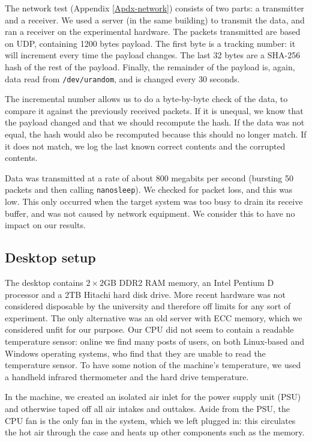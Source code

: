 \documentclass[conference]{IEEEtran}
\begin{document}
The network test (Appendix \ref{Apdx-network}) consists of two parts: a
transmitter and a receiver. We used a server (in the same building) to transmit
the data, and ran a receiver on the experimental hardware. The packets
transmitted are based on UDP, containing 1200 bytes payload. The first byte is
a tracking number: it will increment every time the payload changes. The last
32 bytes are a SHA-256 hash of the rest of the payload. Finally, the remainder
of the payload is, again, data read from \texttt{/dev/urandom}, and is changed
every 30 seconds.

The incremental number allows us to do a byte-by-byte check of the data, to
compare it against the previously received packets. If it is unequal, we know
that the payload changed and that we should recompute the hash. If the data was
not equal, the hash would also be recomputed because this should no longer
match. If it does not match, we log the last known correct contents and the
corrupted contents.

Data was transmitted at a rate of about 800 megabits per second (bursting 50
packets and then calling \texttt{nanosleep}). We checked for packet loss, and this was
low. This only occurred when the target system was too busy to drain its
receive buffer, and was not caused by network equipment. We consider this to
have no impact on our results.

\subsection{Desktop setup}\label{desktop-setup}

The desktop contains $2\times2$GB DDR2 RAM memory, an Intel Pentium D processor
and a 2TB Hitachi hard disk drive. More recent hardware was not considered
disposable by the university and therefore off limits for any sort of
experiment. The only alternative was an old server with ECC memory, which we
considered unfit for our purpose. Our CPU did not seem to contain a readable
temperature sensor: online we find many posts of users, on both Linux-based and
Windows operating systems, who find that they are unable to read the
temperature sensor. To have some notion of the machine's temperature, we used a
handheld infrared thermometer and the hard drive temperature.

In the machine, we created an isolated air inlet for the power supply unit
(PSU) and otherwise taped off all air intakes and outtakes. Aside from the PSU,
the CPU fan is the only fan in the system, which we left plugged in: this
circulates the hot air through the case and heats up other components such as
the memory.
\end{document}
